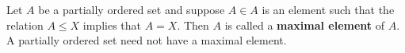 Let $A$ be a partially ordered set and suppose $A \in A$ is an element such that the relation $A \leq X$ implies that $A = X$. Then $A$ is called a \textbf{maximal element} of $A$. A partially ordered set need not have a maximal element.
